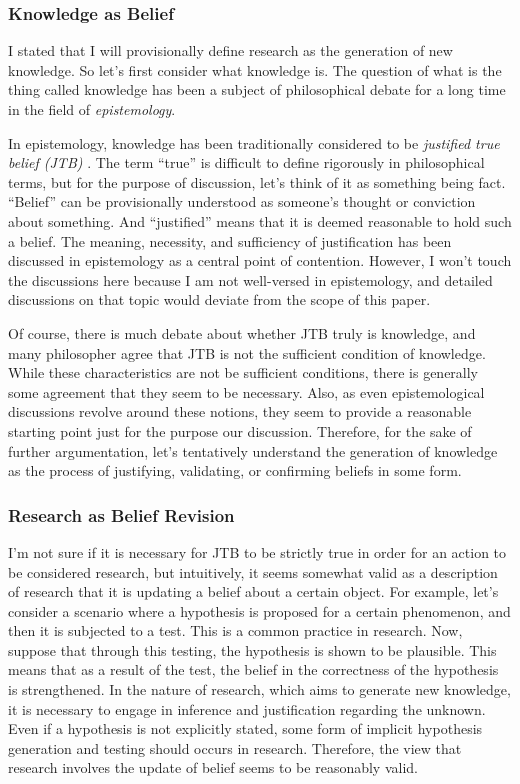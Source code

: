 \documentclass{book}
\begin{document}
\subsubsection{Knowledge as Belief}
I stated that I will provisionally define research as the generation of new knowledge. So let's first consider what knowledge is. The question of what is the thing called knowledge has been a subject of philosophical debate for a long time in the field of \textit{epistemology}.

In epistemology, knowledge has been traditionally considered to be \textit{justified true belief (JTB)} \cite{sep-epistemology}. The term ``true'' is difficult to define rigorously in philosophical terms, but for the purpose of discussion, let's think of it as something being fact. ``Belief'' can be provisionally understood as someone's thought or conviction about something. And ``justified'' means that it is deemed reasonable to hold such a belief. The meaning, necessity, and sufficiency of justification has been discussed in epistemology as a central point of contention. However, I won't touch the discussions here because I am 
 not well-versed in epistemology, and detailed discussions on that topic would deviate from the scope of this paper.

Of course, there is much debate about whether JTB truly is knowledge, and many philosopher agree that JTB is not the sufficient condition of knowledge. While these characteristics are not be sufficient conditions, there is generally some agreement that they seem to be necessary. Also, as even epistemological discussions revolve around these notions, they seem to provide a reasonable starting point just for the purpose our discussion. Therefore, for the sake of further argumentation, let's tentatively understand the generation of knowledge as the process of justifying, validating, or confirming beliefs in some form.

\subsubsection{Research as Belief Revision}
I'm not sure if it is necessary for JTB to be strictly true in order for an action to be considered research, but intuitively, it seems somewhat valid as a description of research that it is updating a belief about a certain object. For example, let's consider a scenario where a hypothesis is proposed for a certain phenomenon, and then it is subjected to a test. This is a common practice in research. Now, suppose that through this testing, the hypothesis is shown to be plausible. This means that as a result of the test, the belief in the correctness of the hypothesis is strengthened. In the nature of research, which aims to generate new knowledge, it is necessary to engage in inference and justification regarding the unknown. Even if a hypothesis is not explicitly stated, some form of implicit hypothesis generation and testing should occurs in research. Therefore, the view that research involves the update of belief seems to be reasonably valid.
\end{document}
